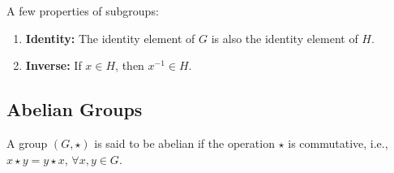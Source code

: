 \documentclass[12pt, oneside]{book}
\begin{document}
A few properties of subgroups:
\begin{enumerate}
    \item \textbf{Identity:} The identity element of \(G\) is also the identity element of \(H\).
    \item \textbf{Inverse:} If \(x \in H\), then \(x^{-1} \in H\).
\end{enumerate}

\subsection{Abelian Groups}
A group \( \left(G, \star \right) \) is said to be abelian if the operation \(\star\) is commutative, i.e., \(x \star y = y \star x\), \(\forall x,y \in G\).
\end{document}
